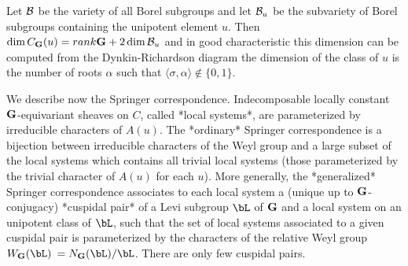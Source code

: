 Let  ${\mathcal B}$ be  the variety  of all  Borel subgroups  and let ${\mathcal B}_u$ be the
subvariety  of Borel subgroups  containing the unipotent  element $u$. Then
$\dim   C_{\bf G}(u)=rank{\bf G}+2\dim{\mathcal B}_u$  and   in  good   characteristic  this
dimension   can  be  computed  from  the  Dynkin-Richardson  diagram\:  the
dimension  of the class  of $u$ is  the number of  roots $\alpha$ such that
$\langle\sigma,\alpha\rangle\notin\{0,1\}$.

We   describe  now  the  Springer  correspondence.  Indecomposable  locally
constant  ${\bf G}$-equivariant  sheaves  on  $C$,  called *local systems*, are
parameterized  by irreducible characters of $A(u)$. The *ordinary* Springer
correspondence  is a bijection  between irreducible characters  of the Weyl
group  and a large subset  of the local systems  which contains all trivial
local  systems (those parameterized by the  trivial character of $A(u)$ for
each  $u$).  More  generally,  the  *generalized*  Springer  correspondence
associates  to each local system a (unique up to ${\bf G}$-conjugacy) *cuspidal
pair*  of a Levi subgroup $\bL$ of ${\bf G}$ and a local system on an unipotent
class  of $\bL$, such that  the set of local  systems associated to a given
cuspidal pair is parameterized by the characters of the relative Weyl group
$W_\bG(\bL)\:=N_\bG(\bL)/\bL$. There are only few cuspidal pairs.

